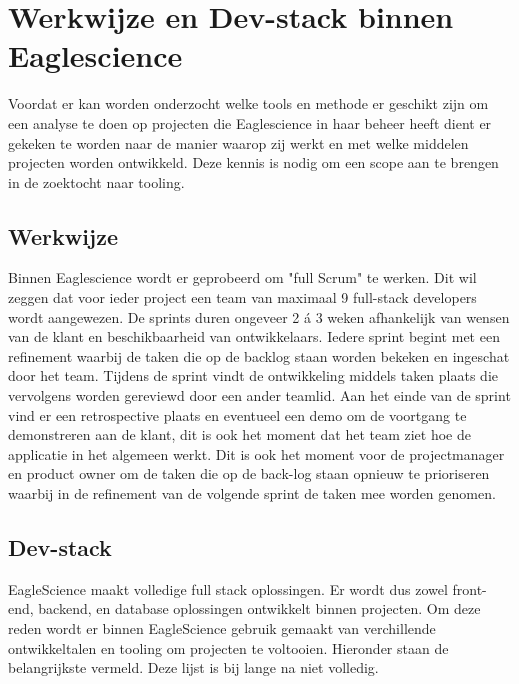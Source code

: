 \section{Werkwijze en Dev-stack binnen Eaglescience}\label{sec:werkwijze-en-dev-stack-binnen-eaglescience}
Voordat er kan worden onderzocht welke tools en methode er geschikt zijn om een analyse te doen op projecten die Eaglescience in haar beheer heeft dient er gekeken te worden naar de manier waarop zij werkt en met welke middelen projecten worden ontwikkeld. Deze kennis is nodig om een scope aan te brengen in de zoektocht naar tooling.

\subsection{Werkwijze}\label{subsec:ESwerkwijze}
Binnen Eaglescience wordt er geprobeerd om "full Scrum" te werken. Dit wil zeggen dat voor ieder project een team van maximaal 9 full-stack developers wordt aangewezen. De sprints duren ongeveer 2 á 3 weken afhankelijk van wensen van de klant en beschikbaarheid van ontwikkelaars. Iedere sprint begint met een refinement waarbij de taken die op de backlog staan worden bekeken en ingeschat door het team. Tijdens de sprint vindt de ontwikkeling middels taken plaats die vervolgens worden gereviewd door een ander teamlid. Aan het einde van de sprint vind er een retrospective plaats en eventueel een demo om de voortgang te demonstreren aan de klant, dit is ook het moment dat het team ziet hoe de applicatie in het algemeen werkt. Dit is ook het moment voor de projectmanager en product owner om de taken die op de back-log staan opnieuw te prioriseren waarbij in de refinement van de volgende sprint de taken mee worden genomen.

\subsection{Dev-stack}\label{subsec:ESdev-stack}
EagleScience maakt volledige full stack oplossingen. Er wordt dus zowel front-end, backend, en database oplossingen ontwikkelt binnen projecten. Om deze reden wordt er binnen EagleScience gebruik gemaakt van verchillende ontwikkeltalen en tooling om projecten te voltooien. Hieronder staan de belangrijkste vermeld. Deze lijst is bij lange na niet volledig.


